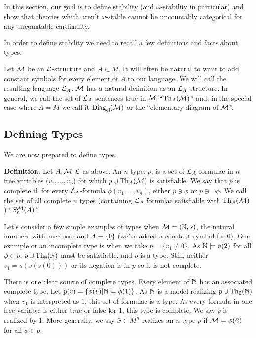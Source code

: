 In this section, our goal is to define stability (and \(\omega\)-stability in particular) and show that theories which aren't \(\omega\)-stable cannot be uncountably categorical for any uncountable cardinality. 

In order to define stability we need to recall a few definitions and facts about types. 

Let \(\mathcal{M}\) be an \(\mathcal{L}\)-structure and \(A \subset M\). 
It will often be natural to want to add constant symbols for every element of \(A\) to our language. 
We will call the resulting language \(\mathcal{L}_A\). \(\mathcal{M}\) has a natural definition as an \(\mathcal{L}_A\)-structure. 
In general, we call the set of \(\mathcal{L}_A\)-sentences true in \(\mathcal{M}\) ``\(\text{Th}_A(\mathcal{M})\)'' and, in the special case where \(A = M\) we call it \(\text{Diag}_\text{el}(\mathcal{M})\) or the ``elementary diagram of \(\mathcal{M}\)''. 

\subsection{Defining Types}

We are now prepared to define types. 

\textbf{Definition.} Let \(A, \mathcal{M}, \mathcal{L}\) as above. 
An \(n\)-type, \(p\), is a set of \(\mathcal{L}_A\)-formulae in \(n\) free variables (\(v_1, \ldots, v_n\)) for which \(p \cup \text{Th}_A(\mathcal{M})\) is satisfiable.
We say that \(p\) is complete if, for every \(\mathcal{L}_A\)-formula \(\phi(v_1, \ldots, v_n)\), either \(p \ni \phi\) or \(p \ni \neg \phi\). 
We call the set of all complete \(n\) types (containing \(\mathcal{L}_A\) formulae satisfiable with \(\text{Th}_A(\mathcal{M})\)) ``\(S_n^{\mathcal{M}}(A)\)''. 

Let's consider a few simple examples of types when  \(\mathcal{M} = (\mathbb{N},s)\), the natural numbers with successor and \(A = \{0\}\) (we've added a constant symbol for 0). 
One example or an incomplete type is when we take \(p = \{v_1 \neq 0\}\). 
As \(\mathbb{N} \models \phi(2)\) for all \(\phi \in p\), \(p \cup \text{Th}_\emptyset(\mathbb{N})\) must be satisfiable, and \(p\) is a type. 
Still, neither \(v_1 = s(s(s(0)))\) or its negation is in \(p\) so it is not complete. 

There is one clear source of complete types. 
Every element of \(\mathbb{N}\) has an associated complete type. 
Let \(p(v) = \{\phi(v) | \mathbb{N} \models \phi(1)\}\). 
As \(\mathbb{N}\) is a model realizing \(p \cup \text{Th}_\emptyset(\mathbb{N})\) when \(v_1\) is interpreted as 1, this set of formulae is a type. 
As every formula in one free variable is either true or false for 1, this type is complete. 
We say \(p\) is realized by 1. 
More generally, we say \(\bar{x} \in M^n\) realizes an \(n\)-type \(p\) if \(\mathcal{M} \models \phi(\bar{x})\) for all \(\phi \in p\).  

